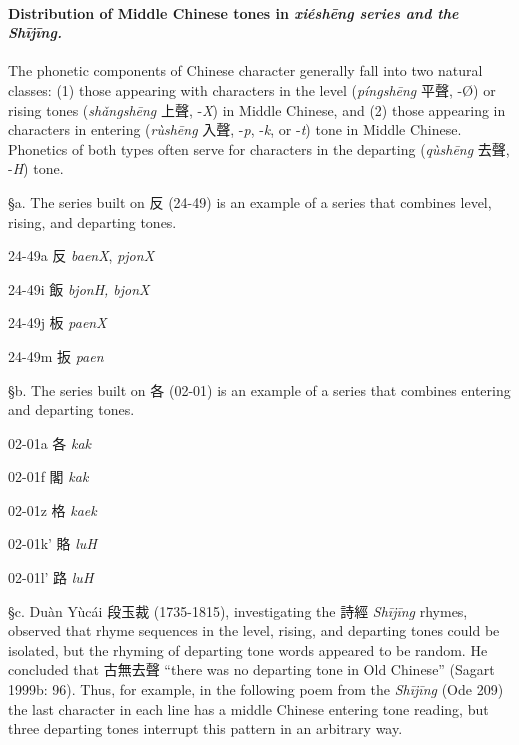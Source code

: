 \paragraph{Distribution of Middle Chinese
tones in  \emph{\textbf{xiéshēng} series and the
 \emph{Shījīng}.}} 
\label{par:distribution-of-MC-tones-in-xs-series-and-the-SJ} 
The phonetic components of Chinese
character generally fall into two natural classes: (1) those appearing
with characters in the level (\emph{píngshēng} 平聲, -Ø) or rising tones
(\emph{shǎngshēng} 上聲, -\emph{X}) in Middle Chinese, and (2) those
appearing in characters in entering (\emph{rùshēng} 入聲, -\emph{p},
-\emph{k}, or -\emph{t}) tone in Middle Chinese. Phonetics of both types
often serve for characters in the departing (\emph{qùshēng} 去聲,
-\emph{H}) tone.

§a. The series built on 反 (24-49) is an example of a series that
combines level, rising, and departing tones.

\begin{description} \item
24-49a 反  \emph{baenX},  \emph{pjonX}

\item
24-49i 飯  \emph{bjonH, bjonX}

\item
24-49j 板  \emph{paenX}

\item
24-49m 扳  \emph{paen}
\end{description}

§b. The series built on 各 (02-01) is an example of a series that
combines entering and departing tones.

\begin{description} \item
02-01a 各 \emph{kak}
\item
02-01f 閣 \emph{kak}
\item
02-01z 格 \emph{kaek}
\item
02-01k' 賂 \emph{luH}
\item
02-01l' 路 \emph{luH}
\end{description}

§c. Duàn Yùcái 段玉裁 (1735-1815), investigating the 詩經  \emph{Shījīng}
rhymes, observed that rhyme sequences in the level, rising, and
departing tones could be isolated, but the rhyming of departing tone
words appeared to be random. He concluded that 古無去聲 ``there was no
departing tone in Old Chinese'' (Sagart 1999b: 96). Thus, for example,
in the following poem from the \emph{Shījīng} (Ode 209) the last
character in each line has a middle Chinese entering tone reading, but
three departing tones interrupt this pattern in an arbitrary way.

